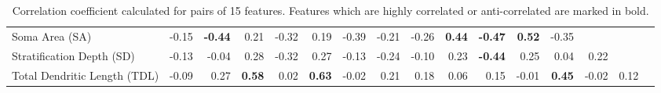 \documentclass[11pt]{article}
\begin{document}
\begin{sidewaystable}
\begin{tabular}{lrrrrrrrrrrrrrrr}
Soma Area (SA) & -0.15 & \textbf{-0.44} & 0.21 & -0.32 & 0.19 & -0.39 & -0.21 & -0.26 & \textbf{0.44} & \textbf{-0.47} & \textbf{0.52} & -0.35 & \textbf{}  &  & \\
Stratification Depth (SD) & -0.13 & -0.04 & 0.28 & -0.32 & 0.27 & -0.13 & -0.24 & -0.10 & 0.23 & \textbf{-0.44} & 0.25 & 0.04 & 0.22 & \textbf{}  & \\
Total Dendritic Length (TDL) & -0.09 & 0.27 & \textbf{0.58} & 0.02 & \textbf{0.63} & -0.02 & 0.21 & 0.18 & 0.06 & 0.15 & -0.01 & \textbf{0.45} & -0.02 & 0.12 & \textbf{} \\
\bottomrule
\end{tabular}
\caption{Correlation coefficient calculated for pairs of 15
  features. Features which are highly correlated or anti-correlated
  are marked in bold.}
\label{tab:corr}\end{sidewaystable}











\end{document}
